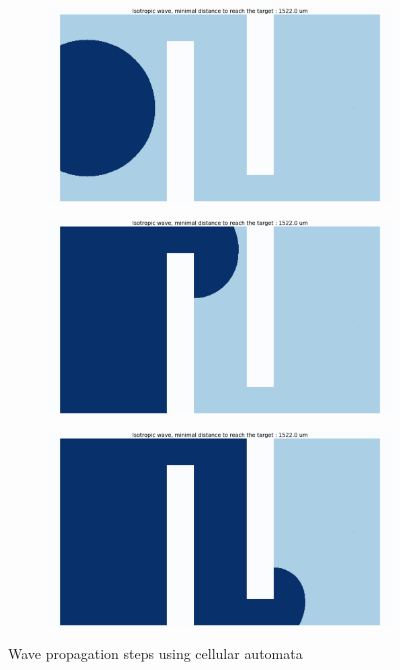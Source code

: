 \documentclass[../main.tex]{subfiles}
\begin{document}
\begin{figure}[H]
	\centering
	\begin{subfigure}[b]{0.32\textwidth}
		\centering
		\includegraphics[width=\textwidth]{IMAGES/part3/ca1.png}
		\caption{}
		\label{fig:ca1}
	\end{subfigure}
	\hfill
	\begin{subfigure}[b]{0.32\textwidth}
		\centering
		\includegraphics[width=\textwidth]{IMAGES/part3/ca2.png}
		\caption{}
		\label{fig:ca2}
	\end{subfigure}
	\hfill
	\begin{subfigure}[b]{0.32\textwidth}
		\centering
		\includegraphics[width=\textwidth]{IMAGES/part3/ca3.png}
		\caption{}
		\label{fig:ca3}
	\end{subfigure}
	\caption{Wave propagation steps using cellular automata}
	\label{fig:ca_result}
\end{figure}
\end{document}
